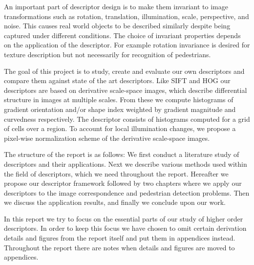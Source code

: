 \documentclass[thesis.tex]{subfiles}
\begin{document}
An important part of descriptor design is to make them invariant to image transformations such as rotation, translation, illumination, scale, perspective, and noise. This causes real world objects to be described similarly despite being captured under different conditions. The choice of invariant properties depends on the application of the descriptor. For example rotation invariance is desired for texture description but not necessarily for recognition of pedestrians.

The goal of this project is to study, create and evaluate our own descriptors and compare them against state of the art descriptors. Like SIFT and HOG our descriptors are based on derivative scale-space images, which describe differential structure in images at multiple scales. From these we compute histograms of gradient orientation and/or shape index weighted by gradient magnitude and curvedness respectively. The descriptor consists of histograms computed for a grid of cells over a region. To account for local illumination changes, we propose a pixel-wise normalization scheme of the derivative scale-space images.

The structure of the report is as follows: We first conduct a literature study of descriptors and their applications. Next we describe various methods used within the field of descriptors, which we need throughout the report. Hereafter we propose our descriptor framework followed by two chapters where we apply our descriptors to the image correspondence and pedestrian detection problems. Then we discuss the application results, and finally we conclude upon our work.

In this report we try to focus on the essential parts of our study of higher order descriptors. In order to keep this focus we have chosen to omit certain derivation details and figures from the report itself and put them in appendices instead. Throughout the report there are notes when details and figures are moved to appendices.

\subbibliography
\end{document}
